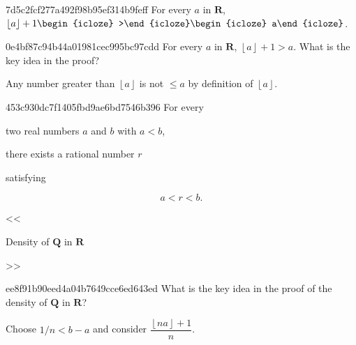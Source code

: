 \begin{note}{7d5c2fcf277a492f98b95ef314b9feff}
    For every \({ a }\) in \({ \mathbf{R} }\),\: \({ \left\lfloor a \right\rfloor + 1 \begin{icloze}{1}>\end{icloze} \begin{icloze}{2}a\end{icloze} }\).
\end{note}

\begin{note}{0e4bf87c94b44a01981cec995bc97cdd}
    For every \({ a }\) in \({ \mathbf{R} }\),\: \({ \left\lfloor a \right\rfloor + 1 > a }\).
    What is the key idea in the proof?

    \begin{cloze}{1}
        Any number greater than \({ \left\lfloor a \right\rfloor }\) is not \({ \leq a }\) by definition of \({ \left\lfloor a \right\rfloor }\).
    \end{cloze}
\end{note}

\begin{note}{453c930dc7f1405fbd9ae6bd7546b396}
    For every \begin{icloze}{3}two real numbers \({ a }\) and \({ b }\) with \({ a < b }\),\end{icloze} \begin{icloze}{2}there exists a rational number \({ r }\)\end{icloze} satisfying
    \begin{icloze}{1}
        \[
            a < r < b.
        \]
    \end{icloze}

    \begin{center}
        \tiny
        <<\begin{icloze}{4}Density of \({ \mathbf{Q} }\) in \({ \mathbf{R} }\)\end{icloze}>>
    \end{center}
\end{note}

\begin{note}{ee8f91b90eed4a04b7649cce6ed643ed}
    What is the key idea in the proof of the density of \({ \mathbf{Q} }\) in \({ \mathbf{R} }\)?

    \begin{cloze}{1}
        Choose \({ 1/n < b - a }\) and consider \({ \dfrac{\left\lfloor na \right\rfloor + 1}{n} }\).
    \end{cloze}
\end{note}

